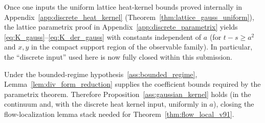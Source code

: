 Once one inputs the uniform lattice heat-kernel bounds proved internally in Appendix~\ref{app:discrete_heat_kernel}
(Theorem~\ref{thm:lattice_gauss_uniform}), the lattice parametrix proof in Appendix~\ref{app:discrete_parametrix} yields
\eqref{eq:K_gauss}--\eqref{eq:K_der_gauss} with constants independent of $a$ (for $t-s\ge a^2$ and $x,y$ in the compact support region of the observable family).
In particular, the ``discrete input'' used here is now fully closed within this submission.

Under the bounded-regime hypothesis~\ref{ass:bounded_regime}, Lemma~\ref{lem:div_form_reduction} supplies the coefficient bounds required by the parametrix theorem.
Therefore Proposition~\ref{ass:gaussian_kernel} holds (in the continuum and, with the discrete heat kernel input, uniformly in $a$),
closing the flow-localization lemma stack needed for Theorem~\ref{thm:flow_local_v91}.
